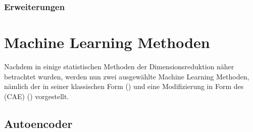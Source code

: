 \subsubsection{Erweiterungen}
\label{ch:MethodenDerDimRed:statistisch:LLE:Erweiterungen}

\newpage
\section{Machine Learning Methoden}
\label{ch:MethodenDerDimRed:modern}
Nachdem in  einige statistischen Methoden der
Dimensionsreduktion näher betrachtet wurden, werden nun zwei ausgewählte Machine Learning Methoden,
nämlich der  in seiner klassischen Form
() und eine Modifizierung in Form des  (CAE) () vorgestellt.

\subsection{Autoencoder}
\label{ch:MethodenDerDimRed:ML:AE}

